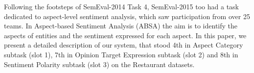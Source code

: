 Following the footsteps of SemEval-2014 Task 4, SemEval-2015 too had a task dedicated to aspect-level sentiment analysis, which saw participation from over 25 teams. In Aspect-based Sentiment Analysis (ABSA) the aim is to identify the aspects of entities and the sentiment expressed for each aspect. In this paper, we present a detailed description of our system, that stood 4th in Aspect Category subtask (slot 1), 7th in Opinion Target Expression subtask (slot 2) and 8th in Sentiment Polarity subtask (slot 3) on the Restaurant datasets.

